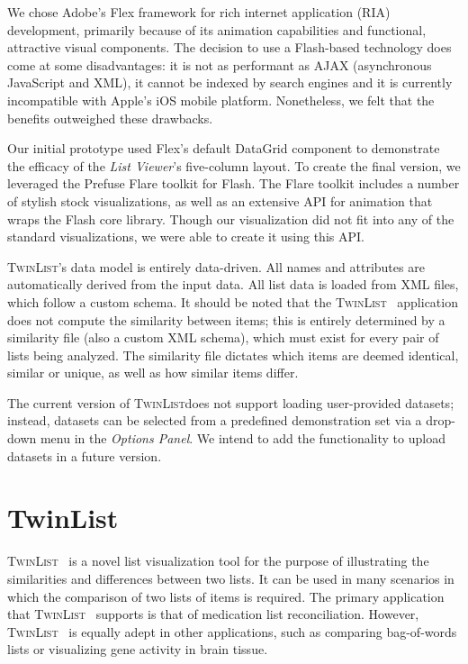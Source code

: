\documentclass{chi2009}
\newcommand{\TwinList}{\textsc{TwinList}}
\newcommand{\ListViewer}{\textit{List Viewer}}
\newcommand{\Options}{\textit{Options Panel}}
\begin{document}
We chose Adobe's Flex framework for rich internet application (RIA) development, primarily because of its animation capabilities and functional, attractive visual components. The decision to use a Flash-based technology does come at some disadvantages: it is not as performant as AJAX (asynchronous JavaScript and XML), it cannot be indexed by search engines and it is currently incompatible with Apple's iOS mobile platform. Nonetheless, we felt that the benefits outweighed these drawbacks.

Our initial prototype used Flex's default \textsf{DataGrid} component to demonstrate the efficacy of the \ListViewer's five-column layout. To create the final version, we leveraged the Prefuse Flare toolkit for Flash. The Flare toolkit includes a number of stylish stock visualizations, as well as an extensive API for animation that wraps the Flash core library. Though our visualization did not fit into any of the standard visualizations, we were able to create it using this API.

\TwinList's data model is entirely data-driven. All names and attributes are automatically derived from the input data. All list data is loaded from XML files, which follow a custom schema. It should be noted that the \TwinList~ application does not compute the similarity between items; this is entirely determined by a similarity file (also a custom XML schema), which must exist for every pair of lists being analyzed. The similarity file dictates which items are deemed identical, similar or unique, as well as how similar items differ.

The current version of \TwinList does not support loading user-provided datasets; instead, datasets can be selected from a predefined demonstration set via a drop-down menu in the \Options. We intend to add the functionality to upload datasets in a future version.

\section{TwinList}
\TwinList~ is a novel list visualization tool for the purpose of illustrating the similarities and differences between two lists. It can be used in many scenarios in which the comparison of two lists of items is required. The primary application that \TwinList~ supports is that of medication list reconciliation. However, \TwinList~ is equally adept in other applications, such as comparing bag-of-words lists or visualizing gene activity in brain tissue.
\end{document}
